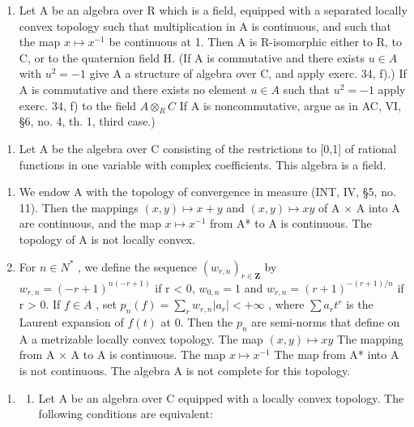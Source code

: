 \begin{enumerate}
\def\labelenumi{\arabic{enumi})}
\setcounter{enumi}{34}
\tightlist
\item
  Let A be an algebra over R which is a field, equipped with a separated locally convex topology such that multiplication in A is continuous, and such that the map \(x \mapsto x^{-1}\) be continuous at 1. Then A is R-isomorphic either to R, to C, or to the quaternion field H. (If A is commutative and there exists \(u \in A\) with \(u^{2} = -1\) give A a structure of algebra over C, and apply exerc. 34, f).) If A is commutative and there exists no element \(u \in A\) such that \(u^{2} = -1\) apply exerc. 34, f) to the field \(A \otimes_{R} C\) If A is noncommutative, argue as in AC, VI, §6, no. 4, th. 1, third case.)
\end{enumerate}

\begin{enumerate}
\def\labelenumi{¶ \arabic{enumi})}
\setcounter{enumi}{35}
\tightlist
\item
  Let A be the algebra over C consisting of the restrictions to {[}0,1{]} of rational functions in one variable with complex coefficients. This algebra is a field.
\end{enumerate}

\begin{enumerate}
\def\labelenumi{\alph{enumi})}
\item
  We endow A with the topology of convergence in measure (INT, IV, §5, no. 11). Then the mappings \((x,y)\mapsto x+y\) and \((x,y)\mapsto xy\) of A × A into A are continuous, and the map \(x\mapsto x^{-1}\) from A* to A is continuous. The topology of A is not locally convex.
\item
  For \(n \in N^{*}\) , we define the sequence \((w_{r,n})_{r \in \mathbf{Z}}\) by \(w_{r,n} = (-r + 1)^{n(-r+1)}\) if r \textless{} 0, \(w_{0,n} = 1\) and \(w_{r,n} = (r + 1)^{-(r+1)/n}\) if r \textgreater{} 0. If \(f \in A\) , set \(p_n(f) = \sum_r w_{r,n} |a_r| < +\infty\) , where \(\sum a_r t^r\) is the Laurent expansion of \(f(t)\) at 0. Then the \(p_n\) are semi-norms that define on A a metrizable locally convex topology. The map \((x, y) \mapsto xy\) The mapping from A × A to A is continuous. The map \(x \mapsto x^{-1}\) The map from A* into A is not continuous. The algebra A is not complete for this topology.
\end{enumerate}

\begin{enumerate}
\def\labelenumi{\arabic{enumi})}
\setcounter{enumi}{36}
\tightlist
\item
  \begin{enumerate}
  \def\labelenumii{\alph{enumii})}
  \tightlist
  \item
    Let A be an algebra over C equipped with a locally convex topology. The following conditions are equivalent:
  \end{enumerate}
\end{enumerate}


